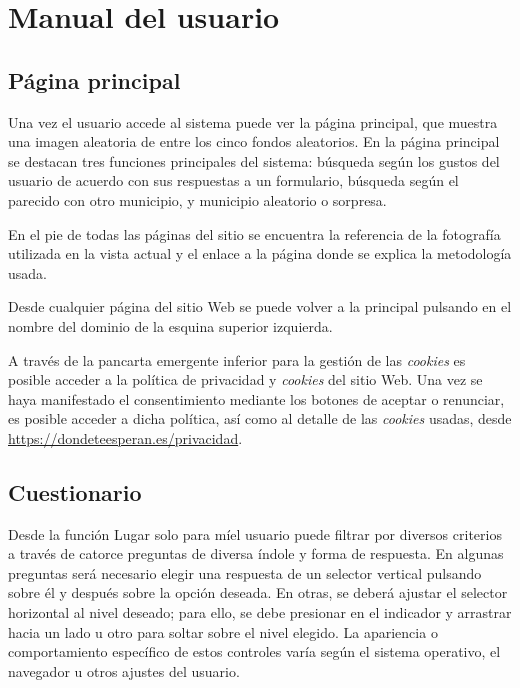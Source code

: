 \section{Manual del usuario}

\subsection{Página principal}

Una vez el usuario accede al sistema puede ver la página principal, que muestra una imagen aleatoria de entre los cinco fondos aleatorios. En la página principal se destacan tres funciones principales del sistema: búsqueda según los gustos del usuario de acuerdo con sus respuestas a un formulario, búsqueda según el parecido con otro municipio, y municipio aleatorio o sorpresa.

En el pie de todas las páginas del sitio se encuentra la referencia de la fotografía utilizada en la vista actual y el enlace a la página donde se explica la metodología usada.

Desde cualquier página del sitio Web se puede volver a la principal pulsando en el nombre del dominio de la esquina superior izquierda.

A través de la pancarta emergente inferior para la gestión de las \textit{cookies} es posible acceder a la política de privacidad y \textit{cookies} del sitio Web. Una vez se haya manifestado el consentimiento mediante los botones de aceptar o renunciar, es posible acceder a dicha política, así como al detalle de las \textit{cookies} usadas, desde \url{https://dondeteesperan.es/privacidad}.


\subsection{Cuestionario}

Desde la función \guillemotleft Lugar solo para mí\guillemotright\space el usuario puede filtrar por diversos criterios a través de catorce preguntas de diversa índole y forma de respuesta. En algunas preguntas será necesario elegir una respuesta de un selector vertical pulsando sobre él y después sobre la opción deseada. En otras, se deberá ajustar el selector horizontal al nivel deseado; para ello, se debe presionar en el indicador y arrastrar hacia un lado u otro para soltar sobre el nivel elegido. La apariencia o comportamiento específico de estos controles varía según el sistema operativo, el navegador u otros ajustes del usuario.

